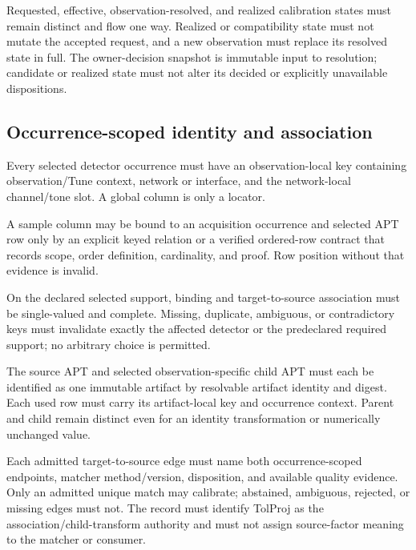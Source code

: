 \begin{description}[style=nextline]
\item[\Req{005}: one-way resolution.]
  Requested, effective, observation-resolved, and realized calibration states
  must remain distinct and flow one way. Realized or compatibility state must
  not mutate the accepted request, and a new observation must replace its
  resolved state in full. The owner-decision snapshot is immutable input to
  resolution; candidate or realized state must not alter its decided or
  explicitly unavailable dispositions.
\end{description}

\subsection{Occurrence-scoped identity and association}

\begin{description}[style=nextline]
\item[\Req{006}: acquisition key.]
  Every selected detector occurrence must have an observation-local key
  containing observation/Tune context, network or interface, and the
  network-local channel/tone slot. A global column is only a locator.

\item[\Req{007}: binding evidence.]
  A sample column may be bound to an acquisition occurrence and selected APT
  row only by an explicit keyed relation or a verified ordered-row contract
  that records scope, order definition, cardinality, and proof. Row position
  without that evidence is invalid.

\item[\Req{008}: unique coverage.]
  On the declared selected support, binding and target-to-source association
  must be single-valued and complete. Missing, duplicate, ambiguous, or
  contradictory keys must invalidate exactly the affected detector or the
  predeclared required support; no arbitrary choice is permitted.

\item[\Req{009}: immutable source and selected-child APT identity.]
  The source APT and selected observation-specific child APT must each be
  identified as one immutable artifact by resolvable artifact identity and
  digest. Each used row must carry its artifact-local key and occurrence
  context. Parent and child remain distinct even for an identity
  transformation or numerically unchanged value.

\item[\Req{010}: association evidence.]
  Each admitted target-to-source edge must name both occurrence-scoped
  endpoints, matcher method/version, disposition, and available quality
  evidence. Only an admitted unique match may calibrate; abstained, ambiguous,
  rejected, or missing edges must not. The record must identify TolProj as the
  association/child-transform authority and must not assign source-factor
  meaning to the matcher or consumer.


\end{description}
